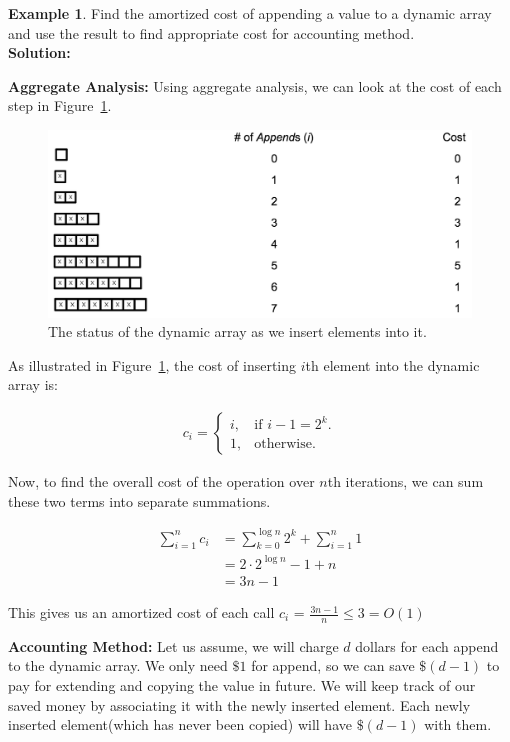 \documentclass[11pt]{article}
\theoremstyle{definition}
\newtheorem{exmp}{Example}[section]
\begin{document}
\begin{exmp}
Find the amortized cost of appending a value to a dynamic array and use the result to find appropriate cost for accounting method.\\

\textbf{Solution:}

\textbf{Aggregate Analysis:}
Using aggregate analysis, we can look at the cost of each step in Figure~\ref{fig:dynamic}.  

\begin{figure}[tbh]
\centering
\includegraphics[scale=0.5]{dynamic}
\caption{The status of the dynamic array as we insert elements into it.}
\label{fig:dynamic}
\end{figure}

As illustrated in Figure~\ref{fig:dynamic}, the cost of inserting $i$th element into the dynamic array is:

\begin{eqnarray*}
c_i = \begin{cases}
  i, & \text{if $i-1=2^k$}. \\
  1, & \text{otherwise}.
\end{cases}
\end{eqnarray*}

Now, to find the overall cost of the operation over $n$th iterations, we can sum these two terms into separate summations.

\begin{align*}
\sum_{i=1}^n c_i &= \sum_{k=0}^{\log{n}} 2^k + \sum_{i=1}^{n} 1 \\
&= 2\cdot2^{\log{n}} - 1 + n \\
&= 3n - 1
\end{align*}

This gives us an amortized cost of each call $\hat{c}_i$ = $\frac{3n-1}{n} \le 3 = O(1)$

\textbf{Accounting Method:}
Let us assume, we will charge $d$ dollars for each append to the dynamic array. We only need $\$1$ for append, so we can save $\$(d-1)$ to pay for extending and copying the value in future. We will keep track of our saved money by associating it with the newly inserted element. Each newly inserted element(which has never been copied) will have $\$(d-1)$ with them.\\


\end{exmp}
\end{document}
